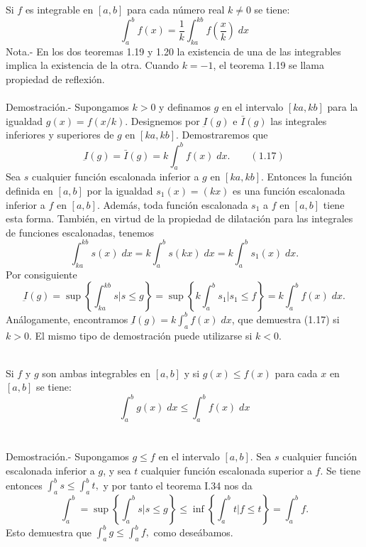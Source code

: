 \begin{teo} Si $f$ es integrable en $[a,b]$ para cada número real $k\neq 0$ se tiene: $$\int_a^b f(x) = \dfrac{1}{k} \int_{ka}^{kb} f\left(\dfrac{x}{k}\right)\; dx$$
    Nota.-\; En los dos teoremas 1.19 y 1.20 la existencia de una de las integrables implica la existencia de la otra. Cuando $k=-1$, el teorema 1.19 se llama propiedad de reflexión.\\\\
    Demostración.-\; Supongamos $k>0$ y definamos $g$ en el intervalo $[ka,kb]$ para la igualdad $g(x)=f(x/k)$. Designemos por $\underbar{I}(g)$ e $\bar{I}(g)$ las integrales inferiores y superiores de $g$ en $[ka,kb]$. Demostraremos que $$\underbar{I}(g) = \bar{I}(g) = k \int_a^b f(x) \; dx. \qquad (1.17)$$
    Sea $s$ cualquier función escalonada inferior a $g$ en $[ka,kb]$. Entonces la función definida en $[a,b]$ por la igualdad $s_1(x) = (kx)$ es una función escalonada inferior a $f$ en $[a,b]$. Además, toda función escalonada $s_1$ a $f$ en $[a,b]$ tiene esta forma. También, en virtud de la propiedad de dilatación para las integrales de funciones escalonadas, tenemos 
    $$\int_{ka}^{kb} s(x)\; dx = k \int_a^b s(kx)\; dx = k \int_a^b s_1(x) \; dx.$$
    Por consiguiente $$\underbar{I}(g) = \sup\left\{\int_{ka}^{kb} s | s\leq g\right\} = \sup\left\{ k \int_a^b s_1 | s_1\leq f\right\} = k \int_a^b f(x) \; dx.$$
    Análogamente, encontramos $\underbar{I}(g) = k \int_a^b f(x)\; dx$, que demuestra (1.17) si $k>0.$ El mismo tipo de demostración puede utilizarse si $k<0$.\\\\

\end{teo}

\begin{teo} Si $f$ y $g$ son ambas integrables en $[a,b]$ y si $g(x)\leq f(x)$ para cada $x$ en $[a,b]$ se tiene: $$\int_a^b g(x)\; dx \leq \int_a^b f(x)\; dx$$\\\\
    Demostración.-\; Supongamos $g\leq f$ en el intervalo $[a,b]$. Sea $s$ cualquier función escalonada inferior a $g$, y sea $t$ cualquier función escalonada superior a $f$. Se tiene entonces $\int_a^b s \leq \int_a^b t,$ y por tanto el teorema I.34 nos da 
    $$\int_a^b = \sup \left\{\int_a^b s | s\leq g \right\} \leq \inf \left\{\int_a^b t | f\leq t\right\} = \int_a^b f.$$
    Esto demuestra que $\int_a^b g \leq \int_a^b f,$ como deseábamos.\\\\

\end{teo}


